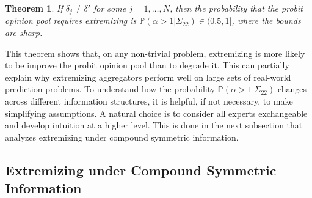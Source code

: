 \documentclass[11pt]{article}
\renewcommand{\P}{\mathbb{P}}
\newtheorem{theorem}{Theorem}[section]
\theoremstyle{definition}
\theoremstyle{definition}
\begin{document}
\begin{theorem}
\label{positiveProbThm}
 If $\delta_j \neq \delta'$ for some $j = 1, \dots, N$, then the probability that the probit opinion pool requires extremizing is $\P(\alpha > 1 | \Sigma_{22}) \in (0.5,1]$, where the bounds are sharp.
\end{theorem}
\noindent
This theorem shows that, on any non-trivial problem, extremizing is more likely to be improve the probit opinion pool than to degrade it. This can partially explain why extremizing aggregators perform well on large sets of real-world prediction problems.  To understand how the probability $\P(\alpha > 1 | \Sigma_{22})$  changes across different information structures,  
 it is helpful, if not necessary, to make simplifying assumptions. A natural choice is to consider all experts exchangeable and develop intuition at a higher level. This is done in the next subsection that analyzes extremizing under compound symmetric information. 




\subsection{Extremizing under Compound Symmetric Information}
\label{compound}
\end{document}
